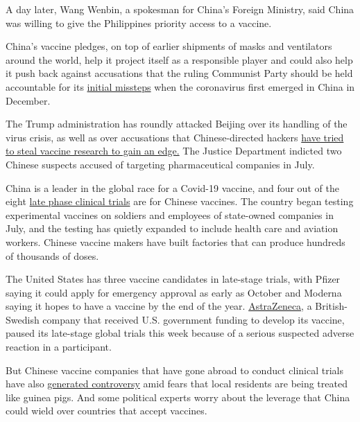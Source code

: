 A day later, Wang Wenbin, a spokesman for China's Foreign Ministry, said
China was willing to give the Philippines priority access to a vaccine.

China's vaccine pledges, on top of earlier shipments of masks and
ventilators around the world, help it project itself as a responsible
player and could also help it push back against accusations that the
ruling Communist Party should be held accountable for its
\href{https://www.nytimes3xbfgragh.onion/2020/08/19/world/asia/china-coronavirus-beijing-trump.html}{initial
missteps} when the coronavirus first emerged in China in December.

The Trump administration has roundly attacked Beijing over its handling
of the virus crisis, as well as over accusations that Chinese-directed
hackers
\href{https://www.nytimes3xbfgragh.onion/2020/07/21/us/politics/china-hacking-coronavirus-vaccine.html}{have
tried to steal vaccine research to gain an edge.} The Justice Department
indicted two Chinese suspects accused of targeting pharmaceutical
companies in July.

China is a leader in the global race for a Covid-19 vaccine, and four
out of the eight
\href{https://www.nytimes3xbfgragh.onion/interactive/2020/science/coronavirus-vaccine-tracker.html}{late
phase clinical trials} are for Chinese vaccines. The country began
testing experimental vaccines on soldiers and employees of state-owned
companies in July, and the testing has quietly expanded to include
health care and aviation workers. Chinese vaccine makers have built
factories that can produce hundreds of thousands of doses.

The United States has three vaccine candidates in late-stage trials,
with Pfizer saying it could apply for emergency approval as early as
October and Moderna saying it hopes to have a vaccine by the end of the
year.
\href{https://www.nytimes3xbfgragh.onion/2020/09/08/health/coronavirus-astrazeneca-vaccine-safety.html}{AstraZeneca},
a British-Swedish company that received U.S. government funding to
develop its vaccine, paused its late-stage global trials this week
because of a serious suspected adverse reaction in a participant.

But Chinese vaccine companies that have gone abroad to conduct clinical
trials have also
\href{https://www.nytimes3xbfgragh.onion/2020/07/16/business/china-vaccine-coronavirus.html}{generated
controversy} amid fears that local residents are being treated like
guinea pigs. And some political experts worry about the leverage that
China could wield over countries that accept vaccines.

